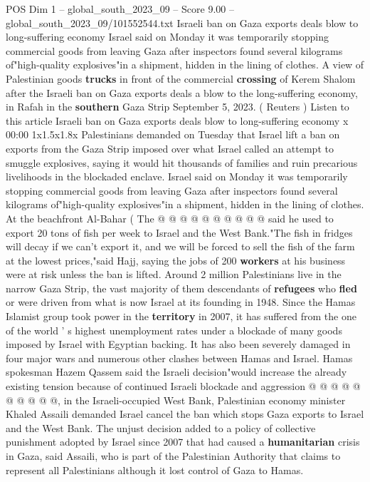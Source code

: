 \begin{textsample}{POS Dim 1 – global\_south\_2023\_09 – Score 9.00 – global\_south\_2023\_09/101552544.txt}  \label{ex:f1_pos_444}
Israeli ban on Gaza exports deals blow to long-suffering economy Israel said on Monday it was temporarily stopping commercial goods from leaving Gaza after inspectors found several kilograms of"high-quality explosives"in a shipment, hidden in the lining of clothes.
A view of Palestinian goods \textbf{trucks} in front of the commercial \textbf{crossing} of Kerem Shalom after the Israeli ban on Gaza exports deals a blow to the long-suffering economy, in Rafah in the \textbf{southern} Gaza Strip September 5, 2023. ( Reuters ) Listen to this article Israeli ban on Gaza exports deals blow to long-suffering economy x 00:00 1x1.5x1.8x Palestinians demanded on Tuesday that Israel lift a ban on exports from the Gaza Strip imposed over what Israel called an attempt to smuggle explosives, saying it would hit thousands of families and ruin precarious livelihoods in the blockaded enclave.
Israel said on Monday it was temporarily stopping commercial goods from leaving Gaza after inspectors found several kilograms of"high-quality explosives"in a shipment, hidden in the lining of clothes.
At the beachfront Al-Bahar ( The @ @ @ @ @ @ @ @ @ @ said he used to export 20 tons of fish per week to Israel and the West Bank."The fish in fridges will decay if we can't export it, and we will be forced to sell the fish of the farm at the lowest prices,"said Hajj, saying the jobs of 200 \textbf{workers} at his business were at risk unless the ban is lifted.
Around 2 million Palestinians live in the narrow Gaza Strip, the vast majority of them descendants of \textbf{refugees} who \textbf{fled} or were driven from what is now Israel at its founding in 1948.
Since the Hamas Islamist group took power in the \textbf{territory} in 2007, it has suffered from the one of the world ' s highest unemployment rates under a blockade of many goods imposed by Israel with Egyptian backing.
It has also been severely damaged in four major wars and numerous other clashes between Hamas and Israel.
Hamas spokesman Hazem Qassem said the Israeli decision"would increase the already existing tension because of continued Israeli blockade and aggression @ @ @ @ @ @ @ @ @ @, in the Israeli-occupied West Bank, Palestinian economy minister Khaled Assaili demanded Israel cancel the ban which stops Gaza exports to Israel and the West Bank.
The unjust decision added to a policy of collective punishment adopted by Israel since 2007 that had caused a \textbf{humanitarian} crisis in Gaza, said Assaili, who is part of the Palestinian Authority that claims to represent all Palestinians although it lost control of Gaza to Hamas.

\end{textsample}
